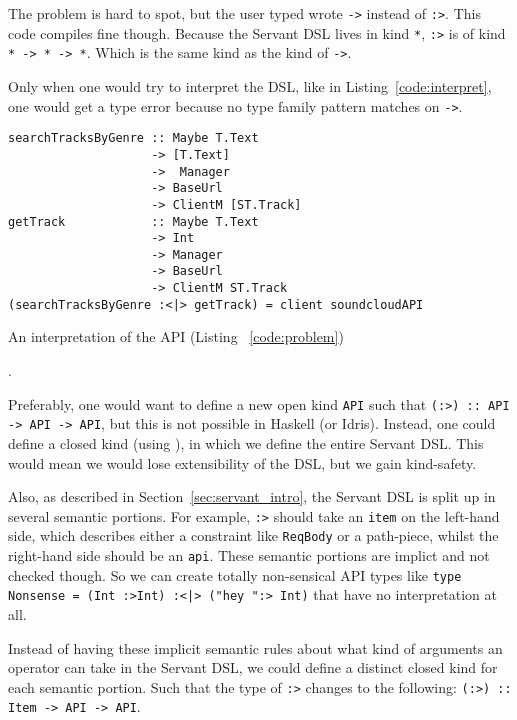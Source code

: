 \documentclass[12pt,a4paper]{article}
\begin{document}
The problem is hard to spot, but the user typed wrote \texttt{->} instead of \texttt{:>}.  This code compiles fine though. Because the Servant DSL lives in kind \texttt{*}, \texttt{:>} is   of kind \texttt{* -> * -> *}. Which is the same kind as the kind of \texttt{->}.

Only when one would try to interpret the DSL, like in Listing~\ref{code:interpret}, one would get a type error because no type family pattern matches on \texttt{->}.

\begin{listing}
\begin{verbatim}
searchTracksByGenre :: Maybe T.Text 
                    -> [T.Text]
                    ->  Manager
                    -> BaseUrl
                    -> ClientM [ST.Track]
getTrack            :: Maybe T.Text
                    -> Int
                    -> Manager
                    -> BaseUrl
                    -> ClientM ST.Track
(searchTracksByGenre :<|> getTrack) = client soundcloudAPI 
\end{verbatim}
  \caption{An interpretation of the API (Listing ~\ref{code:problem})}
  \label{code:interpret}.
\end{listing}

Preferably, one would want to define a new open kind \texttt{API} such that \texttt{(:>) :: API -> API -> API}, but this is not possible in Haskell (or Idris). Instead, one could define a closed kind (using ), in which we define the entire Servant DSL. This would mean we would lose extensibility of the DSL, but we gain kind-safety.

Also, as described in Section~\ref{sec:servant_intro}, the Servant DSL is split up in several semantic portions.  For example, \texttt{:>} should take an \texttt{item} on the left-hand side, which describes either a constraint like \texttt{ReqBody} or a path-piece, whilst the right-hand side should be an \texttt{api}. These semantic portions are implict and not checked though. So we can create totally non-sensical API types like \texttt{type Nonsense = (Int :>Int) :<|> ("hey ":> Int)} that have no interpretation at all.

Instead of having these implicit semantic rules about what kind of arguments an operator can take in the Servant DSL, we could define a distinct closed kind for each semantic portion. Such that the type of \texttt{:>} changes to the following: \texttt{(:>) :: Item -> API -> API}.
\end{document}
